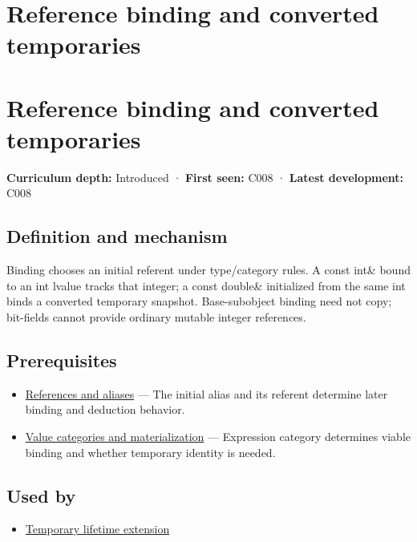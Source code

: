 \hypertarget{appendix-37856d997bb0}{}
\section*{Reference binding and converted temporaries}
\section{Reference binding and converted temporaries}\label{appendix-37856d997bb0-reference-binding-and-converted-temporaries}

\textbf{Curriculum depth:} Introduced · \textbf{First seen:} C008 · \textbf{Latest development:} C008

\subsection{Definition and mechanism}\label{appendix-37856d997bb0-definition-and-mechanism}

Binding chooses an initial referent under type/category rules. A const int\& bound to an int lvalue tracks that integer; a const double\& initialized from the same int binds a converted temporary snapshot. Base-subobject binding need not copy; bit-fields cannot provide ordinary mutable integer references.

\subsection{Prerequisites}\label{appendix-37856d997bb0-prerequisites}

\begin{itemize}
\tightlist
\item
  \hyperref[appendix-d6d562ca9fbb]{References and aliases} --- The initial alias and its referent determine later binding and deduction behavior.
\item
  \hyperref[appendix-1121b30eaeb0]{Value categories and materialization} --- Expression category determines viable binding and whether temporary identity is needed.
\end{itemize}

\subsection{Used by}\label{appendix-37856d997bb0-used-by}

\begin{itemize}
\tightlist
\item
  \hyperref[appendix-a978b29bbbb0]{Temporary lifetime extension}
\end{itemize}

